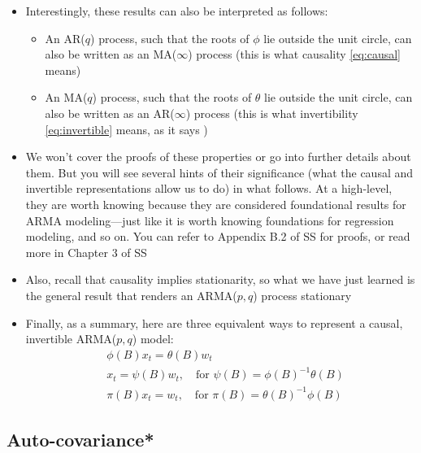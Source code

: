 \documentclass{article}
\begin{document}
\begin{itemize}
\item Interestingly, these results can also be interpreted as follows:
  \begin{itemize}
  \item An AR($q$) process, such that the roots of $\phi$ lie outside the unit
    circle, can also be written as an MA($\infty$) process (this is what
    causality \eqref{eq:causal} means)

  \item An MA($q$) process, such that the roots of $\theta$ lie outside the 
  unit circle, can also be written as an AR($\infty$) process (this is what 
  invertibility \eqref{eq:invertible} means, as it says
  )
  \end{itemize}

\item We won't cover the proofs of these properties or go into further details
  about them. But you will see several hints of their significance (what the
  causal and invertible representations allow us to do) in what follows. At 
  a high-level, they are worth knowing because they are considered foundational 
  results for ARMA modeling---just like it is worth knowing foundations for  
  regression modeling, and so on. You can refer to Appendix B.2 of SS for
  proofs, or read more in Chapter 3 of SS 

\item Also, recall that causality implies stationarity, so what we have just
  learned is the general result that renders an ARMA($p,q$) process stationary 

\item Finally, as a summary, here are three equivalent ways to represent a
  causal, invertible ARMA($p,q$) model:
  \begin{align*}
  &\phi(B) x_t = \theta(B) w_t \\
  &x_t = \psi(B) w_t, \quad \text{for $\psi(B) = \phi(B)^{-1} \theta(B)$} \\ 
  &\pi(B) x_t = w_t, \quad \text{for $\pi(B) = \theta(B)^{-1} \phi(B)$} 
  \end{align*}
\end{itemize}

\subsection{Auto-covariance*}
\end{document}
